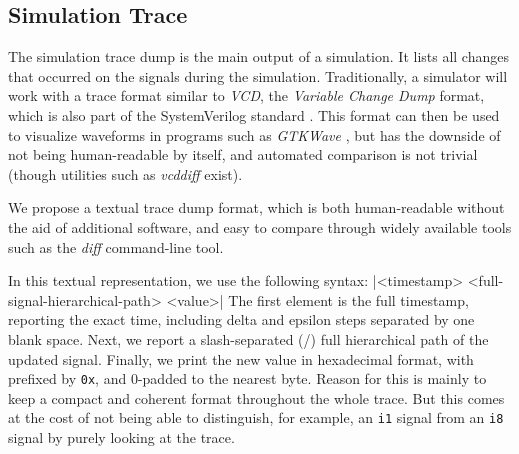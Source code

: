 



\subsection{Simulation Trace}
\label{sec:trace}
The simulation trace dump is the main output of a simulation. It lists all changes that occurred on the signals during the simulation. Traditionally, a simulator will work with a trace format similar to \textit{VCD}, the \textit{Variable Change Dump} format, which is also part of the SystemVerilog standard \cite{SV2018}. This format can then be used to visualize waveforms in programs such as \textit{GTKWave} \cite{gtkwave}, but has the downside of not being human-readable by itself, and automated comparison is not trivial (though utilities such as \textit{vcddiff} \cite{vcddiff} exist).

We propose a textual trace dump format, which is both human-readable without the aid of additional software, and easy to compare through widely available tools such as the \textit{diff} command-line tool.


In this textual representation, we use the following syntax:
|<timestamp>  <full-signal-hierarchical-path>  <value>|
\noindent The first element is the full timestamp, reporting the exact time, including delta and epsilon steps separated by one blank space. Next, we report a slash-separated (/) full hierarchical path of the updated signal.
Finally, we print the new value in hexadecimal format, with prefixed by \texttt{0x}, and $0$-padded to the nearest byte. Reason for this is mainly to keep a compact and coherent format throughout the whole trace. But this comes at the cost of not being able to distinguish, for example, an \texttt{i1} signal from an \texttt{i8} signal by purely looking at the trace.

